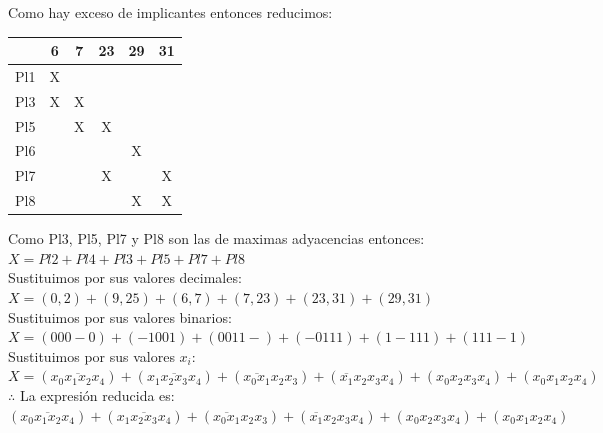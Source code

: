 \documentclass[a4paper,12pt]{article}
\begin{document}
\begin{enumerate}[label=\textcolor{teal}{\textbf{\arabic*.}}]
        Como hay exceso de implicantes entonces reducimos:
        \begin{center}
            \begin{tabular}{|c|c|c|c|c|c|}
                \hline
                    & 6 & 7  & 23 & 29 & 31\\ \hline
                Pl1 & X &    &    &    &   \\ \hline 
                \rowcolor{yellow!50} Pl3 & X & X  &    &    &   \\ \hline 
                \rowcolor{yellow!50} Pl5 &  & X  &  X &    &   \\ \hline 
                Pl6 &  &    &    & X  &   \\ \hline 
                \rowcolor{yellow!50} Pl7 &  &    & X  &    & X \\ \hline 
                \rowcolor{yellow!50} Pl8 &  &    &    & X  & X \\ \hline 
            \end{tabular}
        \end{center}
        Como Pl3, Pl5, Pl7 y Pl8 son las de maximas adyacencias entonces:\\
        $X = Pl2 + Pl4 + Pl3 + Pl5 + Pl7 + Pl8$\\
        Sustituimos por sus valores decimales:\\
        $X = (0,2) + (9,25) + (6,7) + (7,23) + (23,31) + (29,31)$\\
        Sustituimos por sus valores binarios:\\
        $X = (000-0) + (-1001) + (0011-) + (-0111) + (1-111) + (111-1)$\\
        Sustituimos por sus valores $x_{i}$:\\
        $X = (\overline{x_0 x_1 x_2 x_4}) + (x_1 \overline{x_2 x_3} x_4) + (\overline{x_0 x_1} x_2 x_3) + (\overline{x_1} x_2 x_3 x_4) + (x_0 x_2 x_3 x_4) + (x_0 x_1 x_2 x_4)$\\
        $\therefore$ La expresión reducida es: \\
        $(\overline{x_0 x_1 x_2 x_4}) + (x_1 \overline{x_2 x_3} x_4) + (\overline{x_0 x_1} x_2 x_3) + (\overline{x_1} x_2 x_3 x_4) + (x_0 x_2 x_3 x_4) + (x_0 x_1 x_2 x_4)$\\


\end{enumerate}


\end{document}
